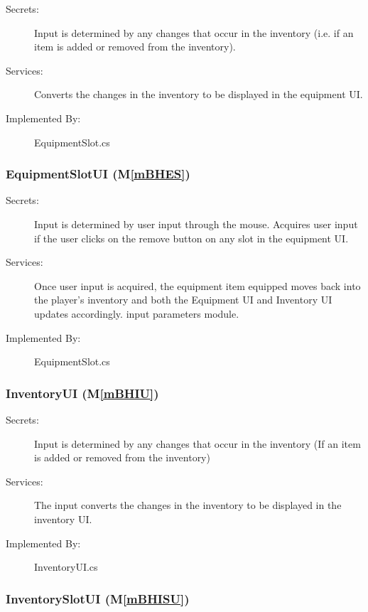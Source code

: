 \documentclass[12pt, titlepage]{article}
\newcommand{\mref}[1]{M\ref{#1}}
\begin{document}
\begin{description}
\item[Secrets:] Input is determined by any changes that occur in the inventory (i.e. if an item is added or removed from the inventory).
\item[Services:] Converts the changes in the inventory to be displayed in the equipment UI.
\item[Implemented By:] EquipmentSlot.cs
\end{description}

\subsubsection{EquipmentSlotUI (\mref{mBHES})}

\begin{description}
\item[Secrets:] Input is determined by user input through the mouse. Acquires user input if the user clicks on the remove button on any slot in the equipment UI.
\item[Services:] Once user input is acquired, the equipment item equipped moves back into the player's inventory and both the Equipment UI and Inventory UI updates accordingly.
  input parameters module.
\item[Implemented By:] EquipmentSlot.cs
\end{description}

\subsubsection{InventoryUI (\mref{mBHIU})}

\begin{description}
\item[Secrets:] Input is determined by any changes that occur in the inventory (If an item is added or removed from the inventory) 
\item[Services:] The input converts the changes in the inventory to be displayed in the inventory UI.
\item[Implemented By:] InventoryUI.cs
\end{description}

\subsubsection{InventorySlotUI (\mref{mBHISU})}
\end{document}
